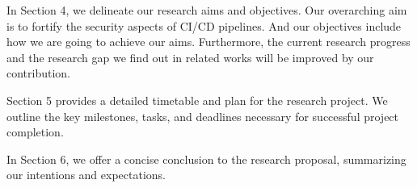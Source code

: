 In Section 4, we delineate our research aims and objectives. Our overarching aim is to fortify the security aspects of CI/CD pipelines. 
And our objectives include how we are going to achieve our aims. Furthermore, the current research 
progress and the research gap we find out in related works will be improved by our contribution.

Section 5 provides a detailed timetable and plan for the research project. 
We outline the key milestones, tasks, and deadlines necessary for successful project completion.

In Section 6, we offer a concise conclusion to the research proposal, summarizing our intentions and expectations.